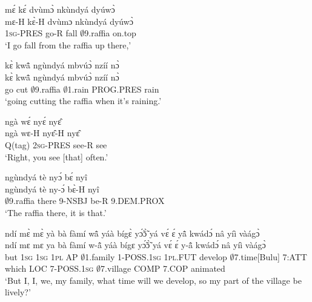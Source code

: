 \begin{exe} 
\exC\label{37} 
  \glll   mɛ́ kɛ́ dvùmɔ̀ nkùndyá dyúwɔ̀ \\
         mɛ-H kɛ̀-H dvùmɔ nkùndyá dyúwɔ̀ \\
            1\textsc{sg}-PRES go-R fall $\emptyset$9.raffia on.top \\
    \trans `I go fall from the raffia up there,'
\end{exe}

\begin{exe} 
\exC\label{38} 
  \glll   kɛ̀ kwã̂ ngùndyá mbvúɔ̀ nzíí nɔ̀ \\
          kɛ̀ kwã̂ ngùndyá mbvúɔ̀ nzíí nɔ̀ \\
           go cut  $\emptyset$9.raffia $\emptyset$1.rain PROG.PRES rain \\
    \trans `going cutting the raffia when it's raining.'
\end{exe}

\begin{exe} 
\exC\label{39}
  \glll   ngà wɛ́ nyɛ́ nyɛ̂  \\
         ngà wɛ-H nyɛ̂-H nyɛ̂ \\
            Q(tag) 2\textsc{sg}-PRES see-R see \\
    \trans `Right, you see [that] often.'
\end{exe}

\begin{exe} 
\exC\label{40}
  \glll   ngùndyá tè nyɔ́ bɛ́ nyî \\
          ngùndyá tè ny-ɔ́ bɛ̀-H nyî \\
           $\emptyset$9.raffia there 9-NSBJ be-R 9.DEM.PROX  \\
    \trans `The raffia there, it is that.'
\end{exe}

\begin{exe} 
\exC\label{41}
  \glll   ndí mɛ̀ mɛ̀ yà bà fàmí wã̂ yáà bígɛ̀ yɔ̃́ɔ̃̀ yá vɛ́ ɛ́ yã̂ kwádɔ́ nâ yíì vàágɔ̀ \\
         ndí mɛ mɛ ya bà fàmí w-ã̂ yáà bígɛ yɔ̃́ɔ̃̀ yá vɛ́ ɛ́ y-ã̂ kwádɔ́ nâ yíì vàágɔ̀ \\
            but 1\textsc{sg} 1\textsc{sg} 1\textsc{pl} AP $\emptyset$1.family 1-POSS.1\textsc{sg} 1\textsc{pl}.FUT develop $\emptyset$7.time[Bulu] 7:ATT which LOC 7-POSS.1\textsc{sg}  $\emptyset$7.village COMP 7.COP animated \\
    \trans `But I, I, we, my family, what time will we develop, so my part of the village be lively?'
\end{exe}

